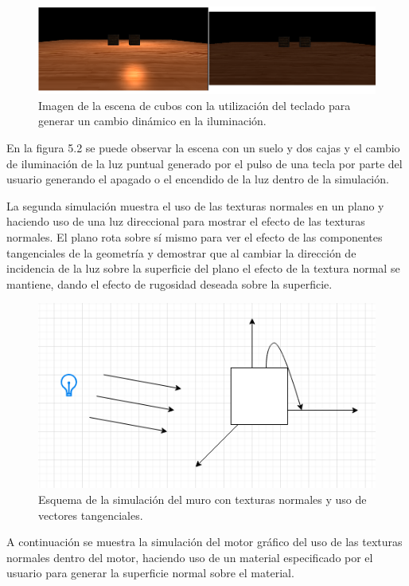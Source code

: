 \documentclass[a4paper, 17pt]{book}
\begin{document}
\begin{figure}[hbt!]
    \centering
    \includegraphics[scale=0.45, keepaspectratio]{img/CubeEvents.png}
    \caption{Imagen de la escena de cubos con la utilización del teclado para generar un cambio dinámico en la iluminación.}
    \label{figura:CubeEvents}
\end{figure}

En la figura 5.2 se puede observar la escena con un suelo y dos cajas y el cambio de iluminación de la luz puntual generado por
el pulso de una tecla por parte del usuario generando el apagado o el encendido de la luz dentro de la simulación.

La segunda simulación muestra el uso de las texturas normales en un plano y haciendo uso de una luz direccional para mostrar
el efecto de las texturas normales. El plano rota sobre sí mismo para ver el efecto de las componentes tangenciales de la
geometría y demostrar que al cambiar la dirección de incidencia de la luz sobre la superficie del plano el efecto de la textura
normal se mantiene, dando el efecto de rugosidad deseada sobre la superficie.

\begin{figure}[hbt!]
    \centering
    \includegraphics[scale=0.75, keepaspectratio]{img/WallDiagram.png}
    \caption{Esquema de la simulación del muro con texturas normales y uso de vectores tangenciales.}
    \label{figura:WallDiagram}
\end{figure}

A continuación se muestra la simulación del motor gráfico del uso de las texturas normales dentro del motor, haciendo uso de un
material especificado por el usuario para generar la superficie normal sobre el material.
\end{document}
